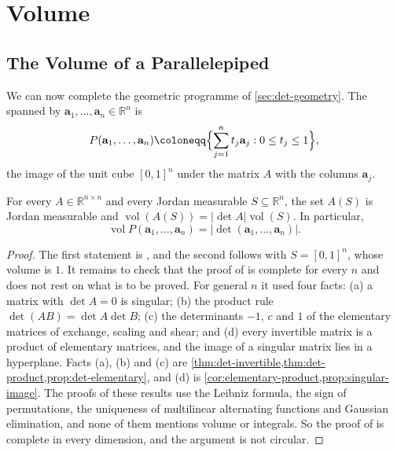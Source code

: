\section{Volume}
\label{sec:det-volume}

\subsection{The Volume of a Parallelepiped}

We can now complete the geometric programme of \cref{sec:det-geometry}. The  spanned by $\mathbf a_1,\ldots,\mathbf a_n\in\mathbb R^n$ is
\[
P(\mathbf a_1,\ldots,\mathbf a_n)\coloneqq\Bigl\{\sum_{j=1}^nt_j\mathbf a_j: 0\le t_j\le1\Bigr\},
\]
the image of the unit cube $[0,1]^n$ under the matrix $A$ with the columns $\mathbf a_j$.

\begin{theorem}
\label{thm:det-volume}
For every $A\in\mathbb R^{n\times n}$ and every Jordan measurable $S\subseteq\mathbb R^n$, the set $A(S)$ is Jordan measurable and $\operatorname{vol}(A(S))=|\det A|\operatorname{vol}(S)$. In particular,
\[
\operatorname{vol}P(\mathbf a_1,\ldots,\mathbf a_n)=|\det(\mathbf a_1,\ldots,\mathbf a_n)| .
\]
\end{theorem}

\begin{proof}
The first statement is , and the second follows with $S=[0,1]^n$, whose volume is $1$. It remains to check that the proof of  is complete for every $n$ and does not rest on what is to be proved. For general $n$ it used four facts: (a) a matrix with $\det A=0$ is singular; (b) the product rule $\det(AB)=\det A\det B$; (c) the determinants $-1$, $c$ and $1$ of the elementary matrices of exchange, scaling and shear; and (d) every invertible matrix is a product of elementary matrices, and the image of a singular matrix lies in a hyperplane. Facts (a), (b) and (c) are \cref{thm:det-invertible,thm:det-product,prop:det-elementary}, and (d) is \cref{cor:elementary-product,prop:singular-image}. The proofs of these results use the Leibniz formula, the sign of permutations, the uniqueness of multilinear alternating functions and Gaussian elimination, and none of them mentions volume or integrals. So the proof of  is complete in every dimension, and the argument is not circular.
\end{proof}


